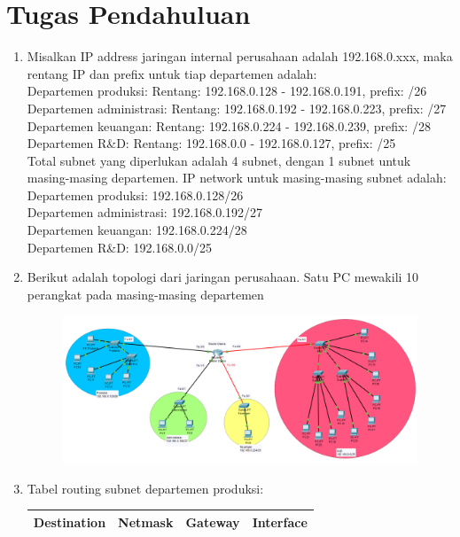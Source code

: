 \section{Tugas Pendahuluan}
\begin{enumerate}
	\item Misalkan IP address jaringan internal perusahaan adalah 192.168.0.xxx, maka rentang IP dan prefix untuk tiap departemen adalah:
	\\
	Departemen produksi: Rentang: 192.168.0.128 - 192.168.0.191, prefix: /26
	\\
	Departemen administrasi: Rentang: 192.168.0.192 - 192.168.0.223, prefix: /27
	\\
	Departemen keuangan: Rentang: 192.168.0.224 - 192.168.0.239, prefix: /28
	\\
	Departemen R\&D: Rentang: 192.168.0.0 - 192.168.0.127, prefix: /25
	\\
	Total subnet yang diperlukan adalah 4 subnet, dengan 1 subnet untuk masing-masing departemen. IP network untuk masing-masing subnet adalah:
	\\
	Departemen produksi: 192.168.0.128/26
	\\
	Departemen administrasi: 192.168.0.192/27
	\\
	Departemen keuangan: 192.168.0.224/28
	\\
	Departemen R\&D: 192.168.0.0/25
	\item Berikut adalah topologi dari jaringan perusahaan. Satu PC mewakili 10 perangkat pada masing-masing departemen
	\begin{figure}[H]
		\includegraphics[scale=0.45]{P1/img/topologi-tupen-r.png}
	\end{figure}
	\item Tabel routing subnet departemen produksi:\\
	\begin{tabular}{| c | c | c | c |}
		\hline
		Destination & Netmask & Gateway & Interface\\
		\hline

\end{tabular}
\end{enumerate}
